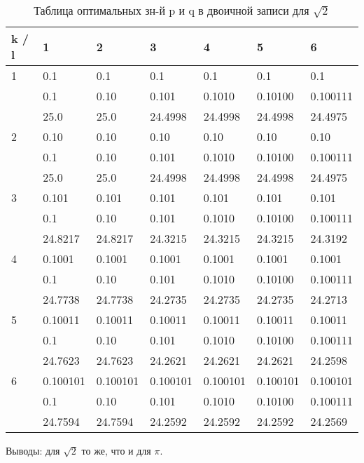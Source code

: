 \documentclass[12pt]{article}
\begin{document}
	\begin{table}[h]
		\caption{Таблица оптимальных зн-й p и q в двоичной записи для $\sqrt{2}$}
		\label{table:2Binary}
		\begin{center}
			\begin{tabular}{|l|l|l|l|l|l|l|}
				\hline
				k / l &1 & 2 & 3 & 4 & 5 & 6\\
				\hline
				1 & 0.1& 0.1& 0.1& 0.1& 0.1& 0.1\\
				& 0.1& 0.10& 0.101& 0.1010& 0.10100& 0.100111\\
				& 25.0& 25.0& 24.4998& 24.4998& 24.4998& 24.4975\\
				\hline
				2 & 0.10& 0.10& 0.10& 0.10& 0.10& 0.10\\
				& 0.1& 0.10& 0.101& 0.1010& 0.10100& 0.100111\\
				& 25.0& 25.0& 24.4998& 24.4998& 24.4998& 24.4975\\
				\hline
				3 & 0.101& 0.101& 0.101& 0.101& 0.101& 0.101\\
				& 0.1& 0.10& 0.101& 0.1010& 0.10100& 0.100111\\
				& 24.8217& 24.8217& 24.3215& 24.3215& 24.3215& 24.3192\\
				\hline
				4 & 0.1001& 0.1001& 0.1001& 0.1001& 0.1001& 0.1001\\
				& 0.1& 0.10& 0.101& 0.1010& 0.10100& 0.100111\\
				& 24.7738& 24.7738& 24.2735& 24.2735& 24.2735& 24.2713\\
				\hline
				5 & 0.10011& 0.10011& 0.10011& 0.10011& 0.10011& 0.10011\\
				& 0.1& 0.10& 0.101& 0.1010& 0.10100& 0.100111\\
				& 24.7623& 24.7623& 24.2621& 24.2621& 24.2621& 24.2598\\
				\hline
				6 & 0.100101& 0.100101& 0.100101& 0.100101& 0.100101& 0.100101\\
				& 0.1& 0.10& 0.101& 0.1010& 0.10100& 0.100111\\
				& 24.7594& 24.7594& 24.2592& 24.2592& 24.2592& 24.2569\\
				\hline
			\end{tabular}
		\end{center}
	\end{table}
	
	Выводы: для $\sqrt{2}$ то же, что и для $\pi$.
	
\end{document}
